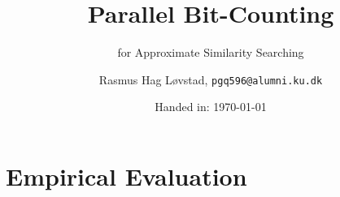 \documentclass[12pt,usenames]{article}
\title{Parallel Bit-Counting} %
\subtitle{for Approximate Similarity Searching} %
\author{Rasmus Hag Løvstad, \texttt{pgq596@alumni.ku.dk}}%
\date{Handed in: \today}%
\begin{document}
\maketitle

\tableofcontents



\section{Empirical Evaluation}





\setcounter{secnumdepth}{0}



\printbibliography
\end{document}
